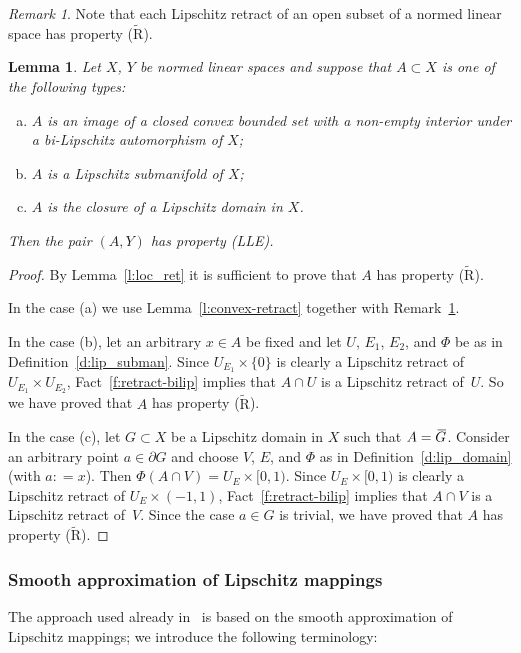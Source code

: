 \documentclass[a4paper,twoside,10pt,reqno,draft]{amsart}
\let\wtilde=\widetilde
\newtheorem{lemma}[theorem]{Lemma}
\theoremstyle{definition}
\theoremstyle{remark}
\newtheorem{remark}[theorem]{Remark}
\newcommand{\cl}[2][3]{{}\mkern#1mu\overline{\mkern-#1mu#2}}
\newcommand\bdry{\partial}
\newcommand\eqdef{\mathrel{\mathop:}=}
\newcommand\pLLE{(LLE)}
\newcommand\pLLR{($\wtilde{\mathrm R}$)}
\begin{document}
\begin{remark}\label{r:ret-loc_ret}
Note that each Lipschitz retract of an open subset of a normed linear space has property \pLLR.
\end{remark}

\begin{lemma}\label{l:LLE_ex}
Let $X$, $Y$ be normed linear spaces and suppose that $A\subset X$ is one of the following types:
\begin{enumerate}[(a)]
\item $A$ is an image of a closed convex bounded set with a non-empty interior under a bi-Lipschitz automorphism of $X$;
\item $A$ is a Lipschitz submanifold of $X$;
\item $A$ is the closure of a Lipschitz domain in $X$.
\end{enumerate}
Then the pair $(A,Y)$ has property {\pLLE}.
\end{lemma}
\begin{proof}
By Lemma~\ref{l:loc_ret} it is sufficient to prove that $A$ has property {\pLLR}.

In the case (a) we use Lemma~\ref{l:convex-retract} together with Remark~\ref{r:ret-loc_ret}.

In the case (b), let an arbitrary $x\in A$ be fixed and let $U$, $E_1$, $E_2$, and $\Phi$ be as in Definition~\ref{d:lip_subman}.
Since $U_{E_1}\times\{0\}$ is clearly a Lipschitz retract of $U_{E_1}\times U_{E_2}$, Fact~\ref{f:retract-bilip} implies that $A\cap U$ is a Lipschitz retract of~$U$.
So we have proved that $A$ has property \pLLR.

In the case (c), let $G\subset X$ be a Lipschitz domain in $X$ such that $A=\cl G$.
Consider an arbitrary point $a\in\bdry G$ and choose $V$, $E$, and $\Phi$ as in Definition~\ref{d:lip_domain} (with $a\eqdef x$).
Then $\Phi(A\cap V)=U_E\times[0,1)$.
Since $U_E\times[0,1)$ is clearly a Lipschitz retract of $U_E\times(-1,1)$, Fact~\ref{f:retract-bilip} implies that $A\cap V$ is a Lipschitz retract of~$V$.
Since the case $a\in G$ is trivial, we have proved that $A$ has property \pLLR.
\end{proof}

\subsubsection{Smooth approximation of Lipschitz mappings}
The approach used already in~\cite{AFK1} is based on the smooth approximation of Lipschitz mappings; we introduce the following terminology:
\end{document}
